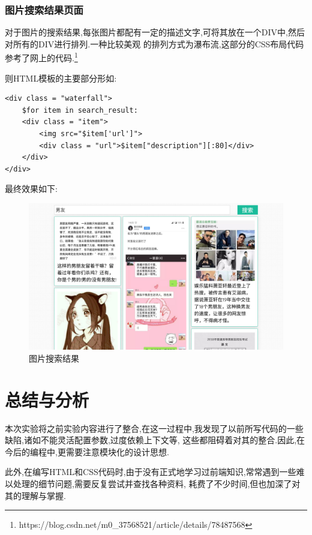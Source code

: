 \documentclass[a4paper]{article}
\begin{document}
        \subsubsection{图片搜索结果页面}
对于图片的搜索结果,每张图片都配有一定的描述文字,可将其放在一个DIV中,然后对所有的DIV进行排列.一种比较美观
的排列方式为瀑布流,这部分的CSS布局代码参考了网上的代码.\footnote{https://blog.csdn.net/m0\_37568521/article/details/78487568}

则HTML模板的主要部分形如:
\begin{verbatim}
<div class = "waterfall">
    $for item in search_result:
    <div class = "item">
        <img src="$item['url']">
        <div class = "url">$item["description"][:80]</div>
    </div>
</div>
\end{verbatim}

最终效果如下:
\begin{figure}[H]
\centering
\includegraphics[width=\textwidth]{img/result_image.jpg}
\caption{图片搜索结果}
\end{figure}
\newpage
    \section{总结与分析}
本次实验将之前实验内容进行了整合,在这一过程中,我发现了以前所写代码的一些缺陷,诸如不能灵活配置参数,过度依赖上下文等,
这些都阻碍着对其的整合.因此,在今后的编程中,更需要注意模块化的设计思想.

此外,在编写HTML和CSS代码时,由于没有正式地学习过前端知识,常常遇到一些难以处理的细节问题,需要反复尝试并查找各种资料,
耗费了不少时间,但也加深了对其的理解与掌握.
\end{document}
